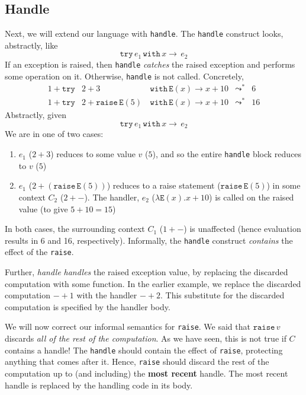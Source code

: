 \subsection{Handle}\label{section:exception-semantics:handle}
Next, we will extend our language with \texttt{handle}. The \texttt{handle} construct looks, abstractly, like
\[\texttt{try}\, e_1 \, \texttt{with} \, x \to \, e_2 \]
If an exception is raised, then \texttt{handle} \textit{catches} the raised exception and performs some operation on it. Otherwise, \texttt{handle} is not called. Concretely,
\[\begin{array}{rrccl}
     1+\texttt{try}& 2+3\, & \texttt{with} \, \texttt{E}(x) \to x+10 &\leadsto^*&6  \\
     1+\texttt{try}& 2+\texttt{raise}\, \texttt{E}(5)\, & \texttt{with} \, \texttt{E}(x) \to x+10 &\leadsto^*&16
\end{array}\]
Abstractly, given 
\[\texttt{try}\, e_1 \, \texttt{with} \, x \to \, e_2 \]
We are in one of two cases: 
\begin{enumerate}
    \item $e_1$ ($2+3$) reduces to some value $v$ ($5$), and so the entire \texttt{handle} block reduces to $v$ ($5$)
    \item $e_1$ ($2+(\texttt{raise}\, \texttt{E}(5))$) reduces to a raise statement ($\texttt{raise} \, \texttt{E}(5)$) in some context $C_2$ ($2 + -$). The handler, $e_2$ ($\lambda \texttt{E}(x). x+10$) is called on the raised value (to give $5+10 = 15$)
\end{enumerate}
In both cases, the surrounding context $C_1$ ($1+-$) is unaffected (hence evaluation results in 6 and 16, respectively). Informally, the \texttt{handle} construct \textit{contains} the effect of the \texttt{raise}.

Further, \textit{handle} \textit{handles} the raised exception value, by replacing the discarded computation with some function. In the earlier example, we replace the discarded computation $- + 1$ with the handler $- + 2$. This substitute for the discarded computation is specified by the handler body. 

We will now correct our informal semantics for \texttt{raise}. We said that $\texttt{raise} \, v$ discards \textit{all of the rest of the computation}. As we have seen, this is not true if $C$ contains a handle! The \texttt{handle} should contain the effect of \texttt{raise}, protecting anything that comes after it. Hence, \texttt{raise} should discard the rest of the computation up to (and including) the \textbf{most recent} handle. The most recent handle is replaced by the handling code in its body.

